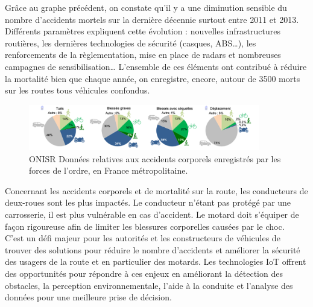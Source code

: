 Grâce au graphe précédent, on constate qu’il y a une diminution sensible du nombre d’accidents mortels sur la dernière décennie surtout entre 2011 et 2013. Différents paramètres expliquent cette évolution : nouvelles infrastructures routières, les dernières technologies de sécurité (casques, ABS…), les renforcements de la règlementation, mise en place de radars et nombreuses campagnes de sensibilisation… L’ensemble de ces éléments ont contribué à réduire la mortalité bien que chaque année, on enregistre, encore, autour de 3500 morts sur les routes tous véhicules confondus. 

\begin{figure}[H]
    \centering
    \includegraphics[width=0.9\textwidth]{images/camambert_accidents_differents_vehicules.png} 
    \caption{ONISR Données relatives aux accidents corporels enregistrés par les forces de l'ordre, en France métropolitaine.}
\end{figure}

Concernant les accidents corporels et de mortalité sur la route, les conducteurs de deux-roues sont les plus impactés. Le conducteur n’étant pas protégé par une carrosserie, il est plus vulnérable en cas d’accident. Le motard doit s’équiper de façon rigoureuse afin de limiter les blessures corporelles causées par le choc.\\
C'est un défi majeur pour les autorités et les constructeurs de véhicules de trouver des solutions pour réduire le nombre d'accidents et améliorer la sécurité des usagers de la route et en particulier des motards. Les technologies IoT offrent des opportunités pour répondre à ces enjeux en améliorant la détection des obstacles, la perception environnementale, l'aide à la conduite et l'analyse des données pour une meilleure prise de décision.\\


